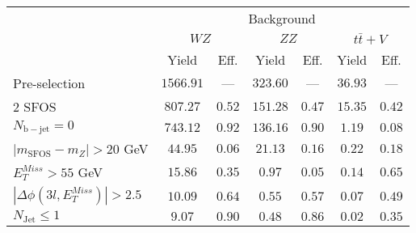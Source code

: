\begin{tabular}{l||c|c||c|c||c|c}
\hline
 &       \multicolumn{6}{c}{Background} \\
 & \multicolumn{2}{c||}{$WZ$} & \multicolumn{2}{c||}{$ZZ$} & \multicolumn{2}{c}{$t\bar{t}+V$}  \\ 
 & Yield & Eff. & Yield & Eff. & Yield & Eff.  \\
\hline\hline
Pre-selection &  $1566.91$ & --- &  $323.60$ & --- &  $36.93$ & --- \\ 
\hline
2 SFOS &  $807.27$ &  $0.52$ &  $151.28$ &  $0.47$ &  $15.35$ &  $0.42$  \\ 
\hline
$N_{\mathrm{b-jet}}=0$ &  $743.12$ &  $0.92$ &  $136.16$ &  $0.90$ &  $1.19$ &  $0.08$ \\ 
\hline
$| m_{\mathrm{SFOS}} - m_Z | >  20$ GeV &  $44.95$ &  $0.06$ &  $21.13$ &  $0.16$ &  $0.22$ &  $0.18$\\ 
\hline
$E_{T}^{Miss} > 55$ GeV &  $15.86$ &  $0.35$ &  $0.97$ &  $0.05$ &  $0.14$ &  $0.65$ \\ 
\hline
$|\Delta\phi(3l,E_{T}^{Miss})| > 2.5$ &  $10.09$ &  $0.64$ &  $0.55$ &  $0.57$ &  $0.07$ &  $0.49$ \\ 
\hline
$N_{\mathrm{Jet}} \leq 1$ &  $9.07$ &  $0.90$ &  $0.48$ &  $0.86$ &  $0.02$ &  $0.35$ \\ 
\hline
\end{tabular}

